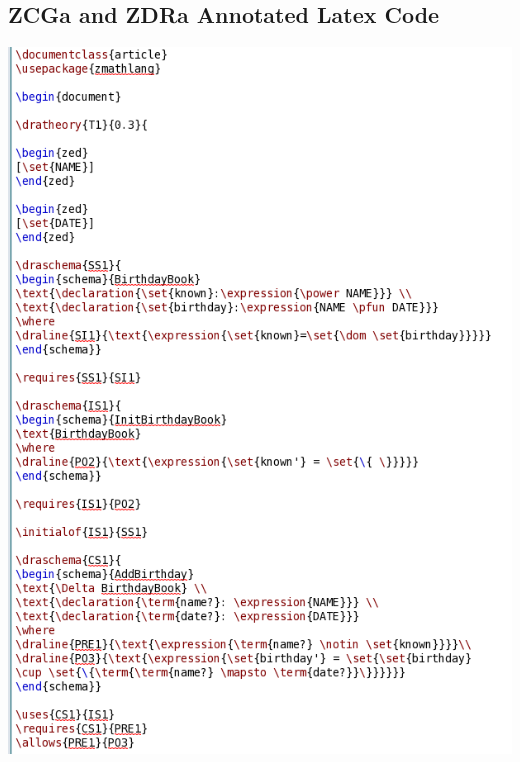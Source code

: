 \subsection{ZCGa and ZDRa Annotated Latex Code}
\label{app:bb1n2}
\includegraphics[scale=0.5]{examples/bb/1n2imagea.png}

